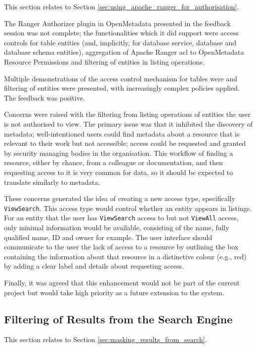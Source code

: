 This section relates to Section \ref{sec:using_apache_ranger_for_authorisation}.

The Ranger Authorizer plugin in OpenMetadata presented in the feedback session was not complete; the functionalities which it did support were access controls for table entities (and, implicitly, for database service, database and database schema entities), aggregation of Apache Ranger \acrshort{acl} to OpenMetadata Resource Permissions and filtering of entities in listing operations.

Multiple demonstrations of the access control mechanism for tables were and filtering of entities were presented, with increasingly complex policies applied. The feedback was positive.

Concerns were raised with the filtering from listing operations of entities the user is not authorised to view. The primary issue was that it inhibited the discovery of metadata; well-intentioned users could find metadata about a resource that is relevant to their work but not accessible; access could be requested and granted by security managing bodies in the organisation. This workflow of finding a resource, either by chance, from a colleague or documentation, and then requesting access to it is very common for data, so it should be expected to translate similarly to metadata.

These concerns generated the idea of creating a new access type, specifically \texttt{ViewSearch}. This access type would control whether an entity appears in listings. For an entity that the user has \texttt{ViewSearch} access to but not \texttt{ViewAll} access, only minimal information would be available, consisting of the name, fully qualified name, ID and owner for example. The user interface should communicate to the user the lack of access to a resource by outlining the box containing the information about that resource in a distinctive colour (e.g., red) by adding a clear label and details about requesting access.

Finally, it was agreed that this enhancement would not be part of the current project but would take high priority as a future extension to the system.

\subsection{Filtering of Results from the Search Engine}

This section relates to Section \ref{sec:masking_results_from_search}.

